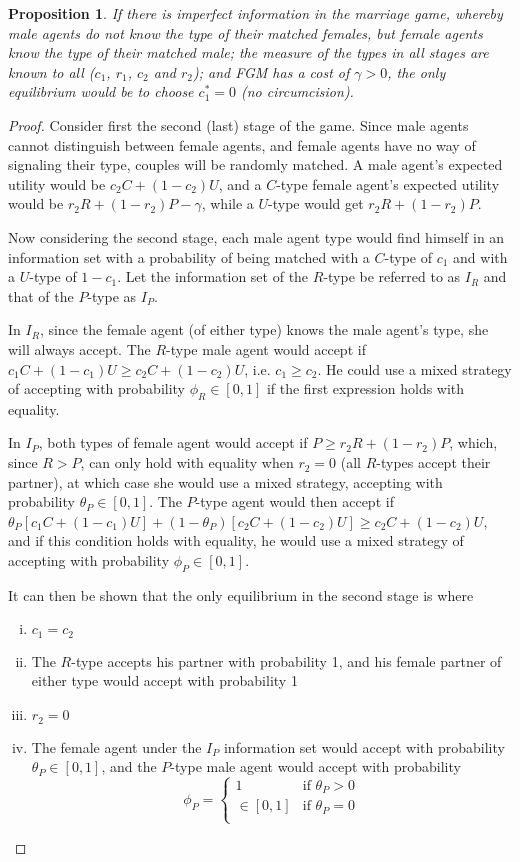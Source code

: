 \documentclass[12pt]{article}
\newtheorem{prop}{Proposition}
\begin{document}
\begin{prop}
  If there is imperfect information in the marriage game, whereby male agents do not know the type of their matched females, but female agents know the type of their matched male; the measure of the types in all stages are known to all ($c_1$, $r_1$, $c_2$ and $r_2$); and FGM has a cost of $\gamma > 0$, the only equilibrium would be to choose $c_1^* = 0$ (no circumcision).
\end{prop}
\begin{proof}
  Consider first the second (last) stage of the game.  Since male agents cannot distinguish between female agents, and female agents have no way of signaling their type, couples will be randomly matched.  A male agent's expected utility would be $c_2 C + (1-c_2)U $, and a $C$-type female agent's expected utility would be $r_2 R + (1 - r_2) P - \gamma$, while a $U$-type would get $r_2 R + (1 - r_2) P$.

  Now considering the second stage, each male agent type would find himself in an information set with a probability of being matched with a $C$-type of $c_1$ and with a $U$-type of $1-c_1$. Let the information set of the $R$-type be referred to as $I_R$ and that of the $P$-type as $I_P$.

  In $I_R$, since the female agent (of either type) knows the male agent's type, she will always accept. The $R$-type male agent would accept if $c_1 C + (1 - c_1)U \geq c_2C + (1-c_2)U$, i.e. $c_1 \geq c_2$.  He could use a mixed strategy of accepting with probability $\phi_R \in [0,1]$ if the first expression holds with equality.

  In $I_P$, both types of female agent would accept if $P \geq r_2R + (1-r_2)P$, which, since $R > P$, can only hold with equality when $r_2 = 0$ (all $R$-types accept their partner), at which case she would use a mixed strategy, accepting with probability $\theta_P \in [0,1]$. The $P$-type agent would then accept if $\theta_P[c_1C + (1-c_1)U] + (1-\theta_P)[c_2C + (1-c_2)U] \geq c_2C + (1-c_2)U$, and if this condition holds with equality, he would use a mixed strategy of accepting with probability $\phi_P \in [0,1]$.

  It can then be shown that the only equilibrium in the second stage is where
    \begin{enumerate}[i.]
      \item $c_1 = c_2$
      \item The $R$-type accepts his partner with probability 1, and his female partner of either type would accept with probability 1
      \item $r_2 = 0$
      \item The female agent under the $I_P$ information set would accept with probability $\theta_P \in [0,1]$, and the $P$-type male agent would accept with probability 
        \[\phi_P = \left\{
            \begin{array}{rl}
              1 & \text{if } \theta_P > 0 \\
              \in[0,1] & \text{if } \theta_P = 0\\
            \end{array} \right.\]
    \end{enumerate}


\end{proof}
\end{document}
